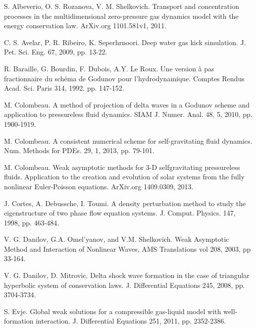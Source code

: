 \documentclass[a4paper,12pt]{article}
\begin{document}
\begin{thebibliography}{< >}

 S. Albeverio, O. S. Rozanova, V. M. Shelkovich. Transport and concentration processes in the multidimensional zero-pressure gas dynamics model with the energy conservation law. ArXiv.org 1101.581v1, 2011.

 C. S. Avelar, P. R. Ribeiro, K. Seperhrnoori. Deep water gas kick simulation. J. Pet. Sci. Eng. 67, 2009, pp. 13-22.



 R. Baraille, G. Bourdin, F. Dubois, A.Y. Le Roux.  Une version    \`a pas fractionnaire du sch\'ema de Godunov pour l'hydrodynamique. Comptes Rendus Acad. Sci. Paris 314, 1992, pp. 147-152.



 M. Colombeau. A method of projection of delta waves in a Godunov scheme and application to pressureless fluid dynamics. SIAM J. Numer. Anal. 48, 5, 2010, pp. 1900-1919.

 M. Colombeau. A consistent numerical scheme for self-gravitating fluid dynamics. Num. Methods for PDEs. 29, 1, 2013, pp. 79-101.


  
  M. Colombeau. Weak asymptotic methods for 3-D selfgravitating pressureless fluids. Application to the creation and evolution of solar systems from the fully nonlinear Euler-Poisson equations.  ArXiv.org 1409.0309, 2013.

 J. Cortes, A. Debussche, I. Toumi. A density perturbation method to study the eigenstructure of two phase flow equation systems. J. Comput. Physics. 147, 1998, pp. 463-484.



  V. G. Danilov, G.A. Omel'yanov, and V.M. Shelkovich. Weak Asymptotic Method and Interaction of Nonlinear Waves, AMS Translations vol 208,  2003, pp 33-164.



 V. G. Danilov, D. Mitrovic. Delta shock wave formation in the case of triangular hyperbolic system of conservation laws. J. Differential Equations 245, 2008, pp. 3704-3734.




 S. Evje. Global weak solutions for a compressible gas-liquid model with well-formation interaction. J. Differential Equations 251, 2011, pp. 2352-2386.



\end{thebibliography}
\end{document}
